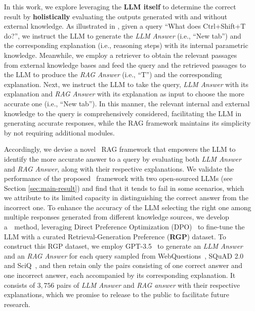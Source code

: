 In this work, we explore leveraging the \textbf{LLM itself} to determine the correct result by \textbf{holistically} evaluating the outputs generated with and without external knowledge.
As illustrated in , given a query ``What does Ctrl+Shift+T do?'', we instruct the LLM to generate the \emph{LLM Answer} (i.e., ``New tab'') and the corresponding explanation (i.e., reasoning steps) with its internal parametric knowledge.
Meanwhile, we employ a retriever to obtain the relevant passages from external knowledge bases and feed the query and the retrieved passages to the LLM to produce the \emph{RAG Answer} (i.e., ``T'') and the corresponding explanation. 
Next, we instruct the LLM to take the query, \emph{LLM Answer} with its explanation and \emph{RAG Answer} with its explanation as input to choose the more accurate one (i.e., ``New tab'').
In this manner, the relevant internal and external knowledge to the query is comprehensively considered, facilitating the LLM in generating accurate responses, while the RAG framework maintains its simplicity by not requiring additional modules.



Accordingly, we devise a novel \framework\ RAG framework that empowers the LLM to identify the more accurate answer to a query by evaluating both \emph{LLM Answer} and \emph{RAG Answer}, along with their respective explanations.
We validate the performance of the proposed \framework~framework with two open-sourced LLMs (see Section \ref{sec:main-result}) and find that it tends to fail in some scenarios, which we attribute to its limited capacity in distinguishing the correct answer from the incorrect one. 
To enhance the accuracy of the LLM selecting the right one among multiple responses generated from different knowledge sources, we develop a~\approach~method, leveraging Direct Preference Optimization (DPO)~\cite{Rafailov2023DPO} to fine-tune the LLM with a curated Retrieval-Generation Preference (\textbf{RGP}) dataset.
To construct this RGP dataset, we employ GPT-3.5~\cite{openai2024gpt4} to generate an \emph{LLM Answer} and an \emph{RAG Answer} for each query sampled from  WebQuestions~\cite{berant2013webq}, SQuAD 2.0~\cite{rajpurkar2018squad} and SciQ~\cite{welbl2017sciq}, and then retain only the pairs consisting of one correct answer and one incorrect answer, each accompanied by its corresponding explanation.
It consists of $3,756$ pairs of \emph{LLM Answer} and \emph{RAG answer} with their respective explanations, which we promise to release to the public to facilitate future research. 


